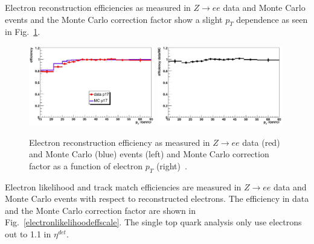Electron reconstruction efficiencies as measured in $Z\rightarrow ee$ data and Monte Carlo events and the Monte Carlo correction factor show a slight $p_{T}$ dependence as seen in Fig.~\ref{electronrecoeffscale}.

\begin{figure}[!h!tbp]
\begin{center}
\includegraphics[width=0.49\textwidth]{eps/Reco/Electron_Reco_eff.eps}
\includegraphics[width=0.49\textwidth]{eps/Reco/Electron_Reco_scale.eps}
\end{center}
\vspace{-0.1in}
\caption{Electron reconstruction efficiency as measured in $Z\rightarrow ee$ data (red) and Monte Carlo (blue) events (left) and Monte Carlo correction factor as a function of electron $p_{T}$ (right)~\cite{electron}.}
\label{electronrecoeffscale}
\end{figure}

Electron likelihood and track match efficiencies are measured in $Z\rightarrow ee$ data and Monte Carlo events with respect to reconstructed electrons. The efficiency in data and the Monte Carlo correction factor are shown in Fig.~\ref{electronlikelihoodeffscale}. The single top quark analysis only use electrons out to 1.1 in $\eta^{det}$.

